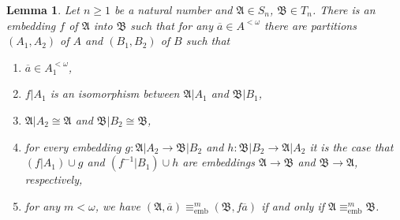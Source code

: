 \documentclass{ndjflart}
\theoremstyle{plain}
\newtheorem{lemma}[conjecture]{Lemma}
\theoremstyle{definition}
\numberwithin{equation}{section}
\DeclareMathOperator{\emb}{emb}
\begin{document}
\begin{lemma}\label{right_emb}
Let $n \geq 1$ be a natural number and
$\mathfrak{A} \in S_n$, $\mathfrak{B}\in T_n$.
There is an embedding $f$ of $\mathfrak{A}$ into $\mathfrak{B}$ such that for
any $\overline{a} \in A^{<\omega}$ there are partitions $(A_1, A_2)$ of $A$ and
$(B_1, B_2)$ of $B$ such that
\begin{enumerate}
\item $\overline{a} \in A_1^{<\omega}$,
\item $f | A_1$ is an isomorphism between $\mathfrak{A} | A_1$ and $\mathfrak{B} | B_1$,
\item $\mathfrak{A} | A_2 \cong \mathfrak{A}$ and $\mathfrak{B}|B_2 \cong \mathfrak{B}$,
\item for every embedding
$g \colon \mathfrak{A}|A_2\rightarrow \mathfrak{B}|B_2$ and
$h \colon \mathfrak{B} |B_2 \rightarrow \mathfrak{A}|A_2$ it is the case that
$(f|A_1) \cup g$ and $(f^{-1}|B_1) \cup h$ are embeddings
$\mathfrak{A} \rightarrow \mathfrak{B}$ and
$\mathfrak{B} \rightarrow \mathfrak{A}$, respectively,
\item for any $m < \omega$, we have
$(\mathfrak{A}, \overline{a}) \equiv^m_{\emb} (\mathfrak{B}, f\overline{a})$
if and only if $\mathfrak{A} \equiv^m_{\emb} \mathfrak{B}$.
\end{enumerate}
\end{lemma}
\end{document}
